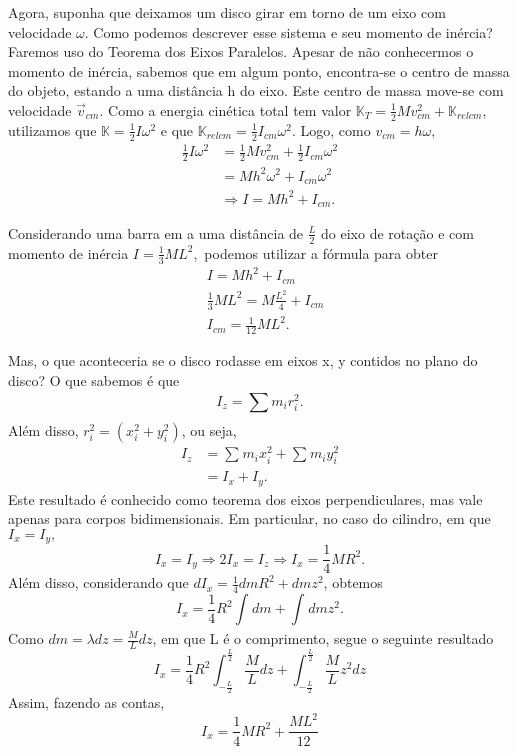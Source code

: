 \documentclass[PhysicsII/physicsII_notes.tex]{subfiles}
\begin{document}
Agora, suponha que deixamos um disco girar em torno de um eixo com velocidade \(\omega \). Como podemos descrever esse sistema e seu momento de inércia?
Faremos uso do Teorema dos Eixos Paralelos. Apesar de não conhecermos o momento de inércia, sabemos que em algum ponto, encontra-se o centro
de massa do objeto, estando a uma distância h do eixo. Este centro de massa move-se com velocidade \(\vec{v}_{cm}\). Como a energia cinética total
tem valor \(\mathbb{K}_{T} = \frac{1}{2}Mv_{cm}^{2} + \mathbb{K}_{relcm}\), utilizamos que \(\mathbb{K} = \frac{1}{2}I\omega^{2}\) e que \(\mathbb{K}_{relcm}=\frac{1}{2}I_{cm}\omega ^{2}\).
Logo, como \(v_{cm} = h\omega ,\)
\begin{align*}
	\frac{1}{2}I\omega^{2} & = \frac{1}{2} Mv_{cm}^{2} + \frac{1}{2}I_{cm}\omega^{2} \\
	                       & = Mh^{2}\omega^{2} + I_{cm}\omega ^{2}                  \\
	                       & \Rightarrow I = Mh^{2} + I_{cm}.
\end{align*}
\begin{example}
	Considerando uma barra em a uma distância de \(\frac{L}{2}\) do eixo de rotação e com momento de inércia
	\(I = \frac{1}{3}ML^{2},\) podemos utilizar a fórmula para obter
	\begin{align*}
		 & I = Mh^{2} + I_{cm}                            \\
		 & \frac{1}{3}ML^{2} = M \frac{L^{2}}{4} + I_{cm} \\
		 & I_{cm} = \frac{1}{12}ML^{2}.
	\end{align*}
\end{example}
Mas, o que aconteceria se o disco rodasse em eixos x, y contidos no plano do disco? O que sabemos é que
\[
	I_{z} = \sum\limits_{}^{}m_{i}r_{i}^{2}.
\]
Além disso, \(r_{i}^{2} = (x_{i}^{2} + y_{i}^{2})\), ou seja,
\begin{align*}
	I_{z} & = \sum\limits_{}^{}m_{i}x_{i}^{2} + \sum\limits_{}^{}m_{i}y_{i}^{2} \\
	      & = I_{x} + I_{y}.
\end{align*}
Este resultado é conhecido como teorema dos eixos perpendiculares, mas vale apenas para corpos bidimensionais.
Em particular, no caso do cilindro, em que \(I_{x} = I_{y},\)
\[
	I_{x} = I_{y} \Rightarrow 2I_{x} = I_{z} \Rightarrow I_{x} = \frac{1}{4}MR^{2}.
\]
Além disso, considerando que \(dI_{x} = \frac{1}{4}dm R^{2} + dm z^{2}\), obtemos
\[
	I_{x} = \frac{1}{4}R^{2} \int_{}^{}dm + \int_{}^{}dm z^{2}.
\]
Como \(dm = \lambda dz = \frac{M}{L}dz\), em que L é o comprimento, segue o seguinte resultado
\[
	I_{x} = \frac{1}{4}R^{2}\int_{-\frac{L}{2}}^{\frac{L}{2}}\frac{M}{L}dz + \int_{-\frac{L}{2}}^{\frac{L}{2}}\frac{M}{L}z^{2}dz
\]
Assim, fazendo as contas,
\[
	I_{x} = \frac{1}{4}MR^{2} + \frac{ML^{2}}{12}
\]
\end{document}
